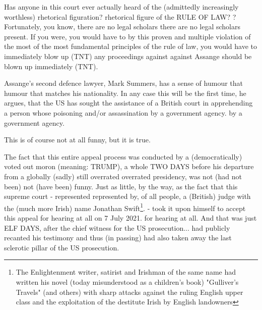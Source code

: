 \begin{multicols}{2}
Has anyone in this court ever actually heard of the (admittedly increasingly worthless) rhetorical figuration?
rhetorical figure of the RULE OF LAW?
? Fortunately, you know, there are no legal scholars
there are no legal scholars present. If you were, you would have to
by this proven and multiple violation of the most
of the most fundamental principles of the rule of law, you would have to immediately blow up (TNT) any proceedings against
against Assange should be blown up immediately (TNT).

Assange's second defence lawyer, Mark Summers, has a sense of humour that
humour that matches his nationality. In any case
this will be the first time, he argues,
that the US has sought the assistance of a British court in apprehending a person whose
poisoning and/or assassination by a government agency.
by a government agency.


This is of course not at all funny, but it is
true.

The fact that this entire appeal process was conducted by a
(democratically) voted out moron (meaning:
TRUMP), a whole TWO DAYS before his departure from a globally (sadly) still overrated
overrated presidency, was not (had not been)
not (have been) funny. Just as little, by the way, as
the fact that this supreme court - represented
represented by, of all people, a (British) judge with the
(much more Irish) name Jonathan Swift\footnote[19]{The Enlightenment writer, satirist and Irishman of the same name had written his novel (today misunderstood as a children's book)
"Gulliver's Travels" (and others) with sharp attacks against the ruling English upper class and the exploitation of the destitute Irish by English landowners}. - took it upon himself
to accept this appeal for hearing at all on 7 July 2021.
for hearing at all. And that was just ELF DAYS,
after the chief witness for the US prosecution...
had publicly recanted his testimony and thus (in passing) had also taken away the last sclerotic pillar of the US prosecution.




\end{multicols}
